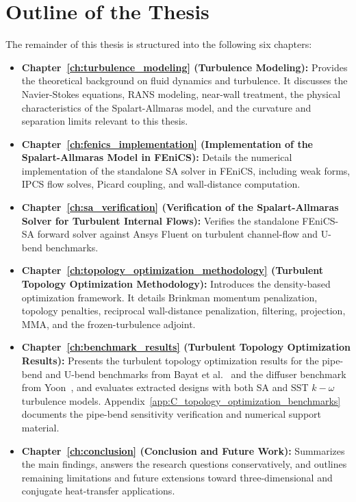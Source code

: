 \section{Outline of the Thesis}
The remainder of this thesis is structured into the following six chapters:
\begin{itemize}
	\item \textbf{Chapter~\ref{ch:turbulence_modeling} (Turbulence Modeling):} Provides the theoretical background on fluid dynamics and turbulence. It discusses the Navier-Stokes equations, RANS modeling, near-wall treatment, the physical characteristics of the Spalart-Allmaras model, and the curvature and separation limits relevant to this thesis.
	\item \textbf{Chapter~\ref{ch:fenics_implementation} (Implementation of the Spalart-Allmaras Model in FEniCS):} Details the numerical implementation of the standalone SA solver in FEniCS, including weak forms, IPCS flow solves, Picard coupling, and wall-distance computation.
	\item \textbf{Chapter~\ref{ch:sa_verification} (Verification of the Spalart-Allmaras Solver for Turbulent Internal Flows):} Verifies the standalone FEniCS-SA forward solver against Ansys Fluent on turbulent channel-flow and U-bend benchmarks.
	\item \textbf{Chapter~\ref{ch:topology_optimization_methodology} (Turbulent Topology Optimization Methodology):} Introduces the density-based optimization framework. It details Brinkman momentum penalization, topology penalties, reciprocal wall-distance penalization, filtering, projection, MMA, and the frozen-turbulence adjoint.
	\item \textbf{Chapter~\ref{ch:benchmark_results} (Turbulent Topology Optimization Results):} Presents the turbulent topology optimization results for the pipe-bend and U-bend benchmarks from Bayat et al.~\cite{Bayat2026} and the diffuser benchmark from Yoon~\cite{Yoon2016}, and evaluates extracted designs with both SA and SST $k-\omega$ turbulence models. Appendix~\ref{app:C_topology_optimization_benchmarks} documents the pipe-bend sensitivity verification and numerical support material.
	\item \textbf{Chapter~\ref{ch:conclusion} (Conclusion and Future Work):} Summarizes the main findings, answers the research questions conservatively, and outlines remaining limitations and future extensions toward three-dimensional and conjugate heat-transfer applications.
\end{itemize}
